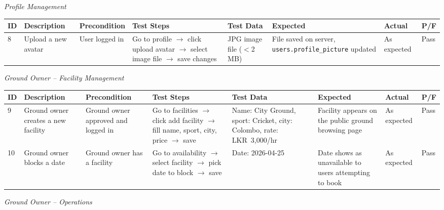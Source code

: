 \documentclass[12pt,a4paper]{report}
\begin{document}
\textit{Profile Management}

\begin{center}
\footnotesize
\begin{longtable}{p{0.4cm} p{2.2cm} p{1.8cm} p{3.2cm} p{2.2cm} p{2.2cm} p{1.4cm} p{0.8cm}}
\toprule
\textbf{ID} & \textbf{Description} & \textbf{Precondition} & \textbf{Test Steps} & \textbf{Test Data} & \textbf{Expected} & \textbf{Actual} & \textbf{P/F}\\
\midrule
\endhead
8 & Upload a new avatar & User logged in & Go to profile $\to$ click upload avatar $\to$ select image file $\to$ save changes & JPG image file ($<$2 MB) & File saved on server, \texttt{users.profile\_picture} updated & As expected & Pass\\
\bottomrule
\end{longtable}
\end{center}

\textit{Ground Owner -- Facility Management}

\begin{center}
\footnotesize
\begin{longtable}{p{0.4cm} p{2.2cm} p{1.8cm} p{3.2cm} p{2.2cm} p{2.2cm} p{1.4cm} p{0.8cm}}
\toprule
\textbf{ID} & \textbf{Description} & \textbf{Precondition} & \textbf{Test Steps} & \textbf{Test Data} & \textbf{Expected} & \textbf{Actual} & \textbf{P/F}\\
\midrule
\endhead
9 & Ground owner creates a new facility & Ground owner approved and logged in & Go to facilities $\to$ click add facility $\to$ fill name, sport, city, price $\to$ save & Name: City Ground, sport: Cricket, city: Colombo, rate: LKR~3,000/hr & Facility appears on the public ground browsing page & As expected & Pass\\[4pt]
10 & Ground owner blocks a date & Ground owner has a facility & Go to availability $\to$ select facility $\to$ pick date to block $\to$ save & Date: 2026-04-25 & Date shows as unavailable to users attempting to book & As expected & Pass\\
\bottomrule
\end{longtable}
\end{center}

\textit{Ground Owner -- Operations}
\end{document}
